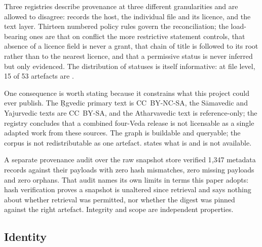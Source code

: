 Three registries describe provenance at three different granularities and are
allowed to disagree:  records the host, 
the individual file and its licence, and  the text layer.
Thirteen numbered policy rules govern the reconciliation; the load-bearing ones are
that on conflict the more restrictive statement controls, that absence of a licence
field is never a grant, that chain of title is followed to its root rather than to the
nearest licence, and that a permissive status is never inferred but only evidenced.
The distribution of statuses is itself informative: at file level, 15 of 53 artefacts
are .

One consequence is worth stating because it constrains what this project could ever
publish. The \d{R}gvedic primary text is CC~BY-NC-SA, the S\=amavedic and Yajurvedic
texts are CC~BY-SA, and the Atharvavedic text is reference-only; the registry
concludes that a combined four-Veda release is not licensable as a single adapted
work from these sources. The graph is buildable and queryable; the corpus is not
redistributable as one artefact.  states what is and is
not available.

A separate provenance audit over the raw snapshot store verified 1{,}347 metadata
records against their payloads with zero hash mismatches, zero missing payloads and
zero orphans. That audit names its own limits in terms this paper adopts: hash
verification proves a snapshot is unaltered since retrieval and says nothing about
whether retrieval was permitted, nor whether the digest was pinned against the right
artefact. Integrity and scope are independent properties.

\subsection{Identity}
\label{sec:identity}

